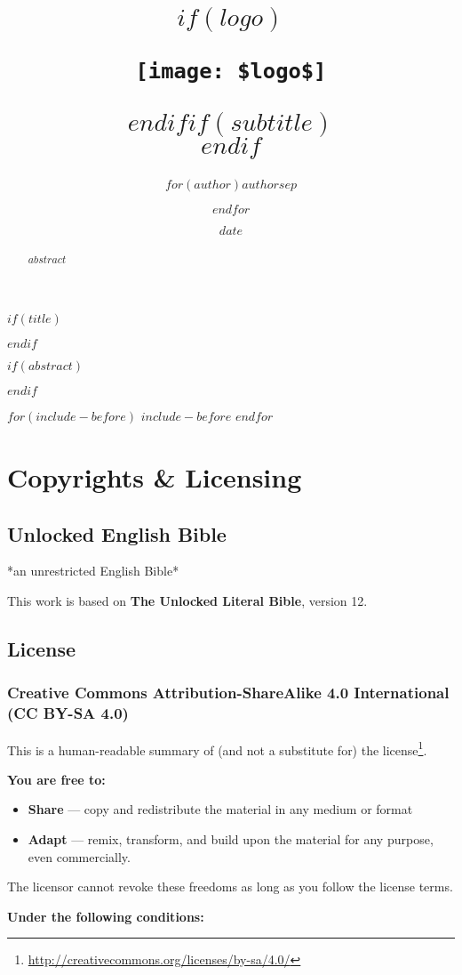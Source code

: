 \documentclass[$fontsize$pt,$if(lang)$$lang$,$endif$$if(papersize)$$papersize$,$endif$$for(classoption)$$classoption$$sep$,$endfor$,openany]{$documentclass$}
\title{$if(logo)$\begin{center}\texttt{[image: \$logo\$]}\end{center}\vspace{\baselineskip}$endif$\Huge $if(subtitle)$\\\vspace{0.5em}{\LARGE }$endif$}
\author{$for(author)$$author$$sep$ \and $endfor$}
\date{\small $date$}
\renewcommand{\href}[2]{#2\footnote{\url{#1}}}
\begin{document}

$if(title)$
  \maketitle
$endif$

$if(abstract)$
  \begin{abstract}
    $abstract$
  \end{abstract}
$endif$

\newpage
{}

$for(include-before)$
  $include-before$
$endfor$

\section{Copyrights \& Licensing}\label{copyrights-licensing}

\subsection{Unlocked English Bible}

*an unrestricted English Bible*

This work is based on \textbf{The Unlocked Literal Bible}, version 12.

\subsection{License}
\subsubsection{Creative Commons Attribution-ShareAlike 4.0 International (CC BY-SA 4.0)}

This is a human-readable summary of (and not a substitute for) the \href{http://creativecommons.org/licenses/by-sa/4.0/}{license}.

\textbf{You are free to:}

\begin{itemize}
\item \textbf{Share} — copy and redistribute the material in any medium or format
\item \textbf{Adapt} — remix, transform, and build upon the material for any purpose, even commercially.
\end{itemize}

The licensor cannot revoke these freedoms as long as you follow the license terms.

\textbf{Under the following conditions:}
\end{document}
